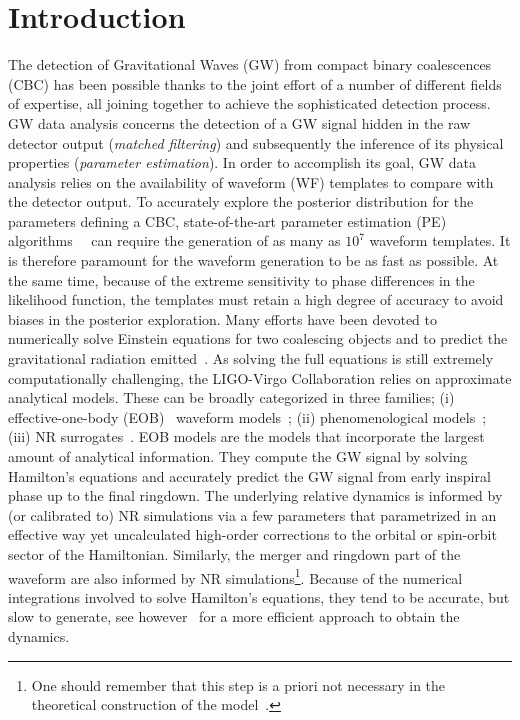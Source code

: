 \section{Introduction}
The detection of Gravitational Waves (GW) from compact binary coalescences (CBC) has been possible thanks to the joint effort of a number of different fields of expertise, all joining together to achieve the sophisticated detection process. GW data analysis concerns the detection of a GW signal hidden in the raw detector output (\textit{matched filtering}) and subsequently the inference of its physical properties (\textit{parameter estimation}). In order to accomplish its goal, GW data analysis relies on the availability of waveform (WF) templates to compare with the detector output.
To accurately explore the posterior distribution for the parameters defining a CBC, state-of-the-art parameter estimation (PE) algorithms~\cite{Aasi:2013jjl}~\cite{Veitch2014wba} can require the generation of as many as $10^7$ waveform templates. It is therefore paramount for the waveform generation to be as fast as possible. At the same time, because of the extreme sensitivity to phase differences in the likelihood  function, 
the templates must retain a high degree of accuracy to avoid biases in the posterior exploration.
Many efforts have been devoted to numerically solve Einstein equations for two coalescing objects and 
to predict the gravitational radiation emitted~\cite{Boyle:2019kee,Healy:2019jyf,Healy:2020vre}.
As solving the full equations is still extremely computationally challenging, the LIGO-Virgo Collaboration 
relies on approximate analytical models. 
These can be broadly categorized in  three families; (i) effective-one-body (EOB)~\cite{Buonanno:2000ef} 
waveform models~\cite{Damour:2009kr,Nagar:2020pcj,Chiaramello:2020ehz,Ossokine:2020kjp}; (ii) phenomenological 
models~\cite{Khan:2015jqa,Pratten:2020ceb,Estelles:2020osj}; (iii) NR surrogates~\cite{Varma:2018mmi,Williams:2019vub,Varma:2019csw,Rifat:2019ltp,Khan:2020fso}.
%
EOB models are the models that incorporate the largest amount of analytical information.
They compute the GW signal by solving Hamilton's equations  and accurately predict the 
GW signal from early inspiral phase up to the final ringdown. The underlying relative dynamics
is informed by (or calibrated to) NR simulations via a few parameters that parametrized in
an effective way yet uncalculated high-order corrections to the orbital or spin-orbit sector 
of the Hamiltonian. Similarly, the merger and ringdown part of the waveform are also informed by NR 
simulations\footnote{One should remember that this step is a priori not necessary in the theoretical 
construction of the model~\cite{Buonanno:2000ef,Damour:2007xr,Damour:2009wj}.}.
Because of the numerical integrations involved to solve Hamilton's equations, they tend to 
be accurate, but slow to generate, see however~\cite{Nagar:2018gnk} for a more efficient 
approach to obtain the dynamics.

